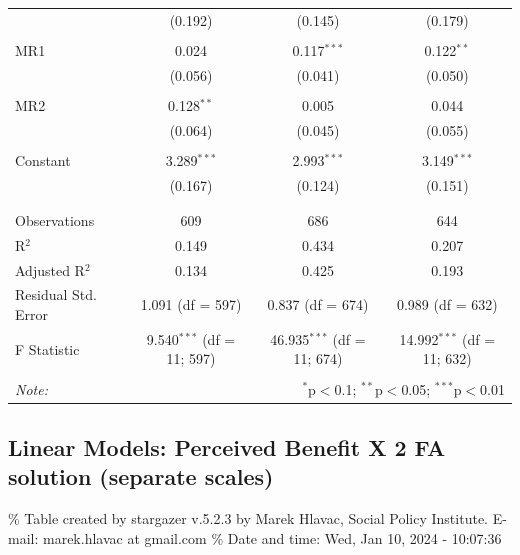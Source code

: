 \documentclass[
]{article}
\begin{document}
\begin{table}[!htbp]
\begin{tabular}{@{\extracolsep{5pt}}lccc}
  & (0.192) & (0.145) & (0.179) \\ 
  & & & \\ 
 MR1 & 0.024 & 0.117$^{***}$ & 0.122$^{**}$ \\ 
  & (0.056) & (0.041) & (0.050) \\ 
  & & & \\ 
 MR2 & 0.128$^{**}$ & 0.005 & 0.044 \\ 
  & (0.064) & (0.045) & (0.055) \\ 
  & & & \\ 
 Constant & 3.289$^{***}$ & 2.993$^{***}$ & 3.149$^{***}$ \\ 
  & (0.167) & (0.124) & (0.151) \\ 
  & & & \\ 
\hline \\[-1.8ex] 
Observations & 609 & 686 & 644 \\ 
R$^{2}$ & 0.149 & 0.434 & 0.207 \\ 
Adjusted R$^{2}$ & 0.134 & 0.425 & 0.193 \\ 
Residual Std. Error & 1.091 (df = 597) & 0.837 (df = 674) & 0.989 (df = 632) \\ 
F Statistic & 9.540$^{***}$ (df = 11; 597) & 46.935$^{***}$ (df = 11; 674) & 14.992$^{***}$ (df = 11; 632) \\ 
\hline 
\hline \\[-1.8ex] 
\textit{Note:}  & \multicolumn{3}{r}{$^{*}$p$<$0.1; $^{**}$p$<$0.05; $^{***}$p$<$0.01} \\ 
\end{tabular} 
\end{table} 
\endgroup

\newpage

\hypertarget{linear-models-perceived-benefit-x-2-fa-solution-separate-scales}{%
\subsection{Linear Models: Perceived Benefit X 2 FA solution (separate
scales)}\label{linear-models-perceived-benefit-x-2-fa-solution-separate-scales}}

\begingroup\setlength{\tabcolsep}{1pt}

\renewcommand{\arraystretch}{0.7}

\% Table created by stargazer v.5.2.3 by Marek Hlavac, Social Policy
Institute. E-mail: marek.hlavac at gmail.com \% Date and time: Wed, Jan
10, 2024 - 10:07:36
\end{document}
